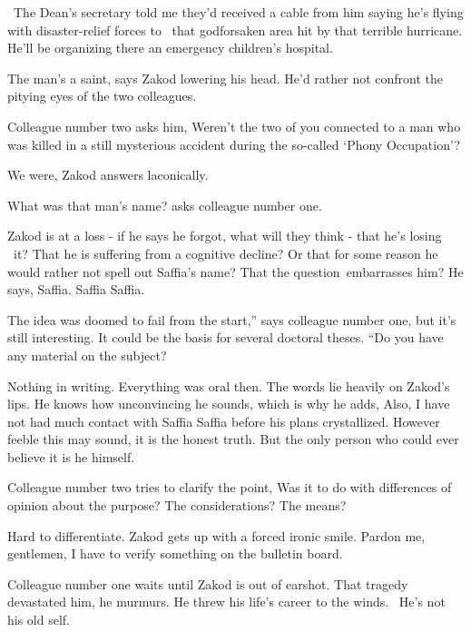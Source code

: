 \documentclass[12pt]{book}
\begin{document}
~{\textquotedbl}The Dean's secretary told me they'd received a cable from him saying he's flying with disaster-relief
forces to {\ }that godforsaken area hit by that terrible hurricane. He'll be organizing there an
emergency children's hospital.{\textquotedbl}

{\textquotedbl}The man's a saint,{\textquotedbl} says Zakod lowering his head. He'd rather not confront the pitying eyes
of the two colleagues.

Colleague number two asks him, {\textquotedbl}Weren't the two of you connected to a man who was killed in a still
mysterious accident during the so-called `Phony Occupation'?{\textquotedbl}

{\textquotedbl}We were,{\textquotedbl} Zakod answers laconically.

{\textquotedbl}What was that man's name?{\textquotedbl} asks colleague number one.

Zakod is at a loss - if he says he forgot, what will they think - that he's losing
{\ }it?{ }That he is suffering from a cognitive decline? Or that for some reason he would
rather not spell out Saffia's name? That the question~embarrasses him? He says, {\textquotedbl}Saffia. Saffia
Saffia.{\textquotedbl}

{\textquotedbl}The idea was doomed to fail from the start,'' says colleague number one, {\textquotedbl}but it's still
interesting. It could be the basis for several doctoral theses. ``Do you have any material on the
subject?{\textquotedbl}

{\textquotedbl}Nothing in writing. Everything was oral then.{\textquotedbl} The words lie heavily on Zakod's lips. He
knows how unconvincing he sounds, which is why he adds, {\textquotedbl}Also, I have not had much contact with Saffia
Saffia before his plans crystallized.{\textquotedbl} However feeble this may sound, it is the honest truth. But the
only person who could ever believe it is he himself.

Colleague number two tries to clarify the point, {\textquotedbl}Was it to do with differences of opinion about the
purpose? The considerations? The means?{\textquotedbl}

{\textquotedbl}Hard to differentiate.{\textquotedbl} Zakod gets up with a forced ironic smile. {\textquotedbl}Pardon me,
gentlemen, I have to verify something on the bulletin board.{\textquotedbl}

Colleague number one waits until Zakod is out of earshot. {\textquotedbl}That tragedy devastated him,{\textquotedbl} he
murmurs. {\textquotedbl}He threw his life's career to the winds. \ He's not his old self.{\textquotedbl}
\end{document}
